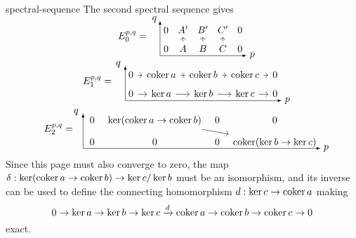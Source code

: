 \begin{example}{spectral-sequence}
    The second spectral sequence gives
    \[ \begin{array}{c}
        E_0^{p, q} = \quad \begin{tikzcd}[row sep=0.5em, column sep=0.1em]
            0 & A' & B' & C' & 0 \\
            0 & A \arrow{u} & B \arrow{u} & C \arrow{u} & 0
        \end{tikzcd} \begin{tikzpicture}[overlay,remember picture]
            \draw[-latex] (-3.1, -0.6) -- (-3.1, 0.65);
            \draw[-latex] (-3.1, -0.6) -- (0, -0.6);
            \node at (0.2, -0.6) {$p$};
            \node at (-3.3, 0.7) {$q$};
        \end{tikzpicture} \\ \; \\
        E_1^{p, q} = \quad \begin{tikzcd}[row sep=0.5em, column sep=0.5em]
            0 \arrow{r} & \coker a \arrow{r} & \coker b \arrow{r} & \coker c \arrow{r} & 0 \\
            0 \arrow{r} & \ker a \arrow{r} & \ker b \arrow{r} & \ker c \arrow{r} & 0
        \end{tikzcd} \begin{tikzpicture}[overlay,remember picture]
            \draw[-latex] (-5.6, -0.6) -- (-5.6, 0.65);
            \draw[-latex] (-5.6, -0.6) -- (0, -0.6);
            \node at (0.2, -0.6) {$p$};
            \node at (-5.85, 0.7) {$q$};
        \end{tikzpicture} \\ \; \\
        E_2^{p, q} = \quad \begin{tikzcd}[row sep=0.5em, column sep=0.5em]
            0 & \ker(\coker a \to \coker b) \arrow{rrd} & 0 & 0 \\
            0 & 0 & 0 & \coker(\ker b \to \ker c)
        \end{tikzcd} \begin{tikzpicture}[overlay,remember picture]
            \draw[-latex] (-8.5, -0.6) -- (-8.5, 0.65);
            \draw[-latex] (-8.5, -0.6) -- (0, -0.6);
            \node at (0.2, -0.6) {$p$};
            \node at (-8.75, 0.7) {$q$};
        \end{tikzpicture}
    \end{array} \]
    Since this page must also converge to zero, the map $\delta : \ker(\operatorname{coker} a \to \operatorname{coker} b) \to \ker c / \ker b$ must be an isomorphism, and its inverse can be used to define the connecting homomorphism $d : \ker c \to \operatorname{coker} a$ making
    \[ 0 \to \ker a \rightarrow \ker b \rightarrow \ker c \xrightarrow{d} \operatorname{coker} a \rightarrow \operatorname{coker} b \rightarrow \operatorname{coker} c \to 0 \]
    exact.
\end{example}

